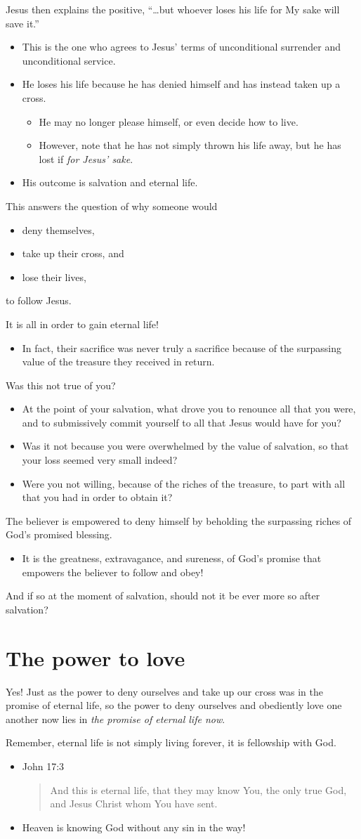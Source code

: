 \documentclass[12pt]{article}
\newcommand{\BI}{\begin{itemize}}
\newcommand{\EI}{\end{itemize}}
\newcommand{\I}{\item}
\newcommand{\Q}[1]{\begin{quote} #1 \end{quote}}
\begin{document}
\I  Jesus then explains the positive, 
        ``\dots but whoever loses his life for My sake will save it.''
\BI \I  This is the one who agrees to Jesus' terms of unconditional 
            surrender and unconditional service.
    \I  He loses his life because he has denied himself and 
            has instead taken up a cross.
    \BI \I  He may no longer please himself, or
                even decide how to live.
        \I  However, note that he has not simply thrown his life away,
                but he has lost if \emph{for Jesus' sake}. \EI  
    \I  His outcome is salvation and eternal life. \EI

\I  This answers the question of why someone would
\BI \I  deny themselves,
    \I  take up their cross, and
    \I  lose their lives, \EI
    to follow Jesus.

\I  It is all in order to gain eternal life!
\BI \I  In fact, their sacrifice was never truly a sacrifice
            because of the surpassing value of the treasure
            they received in return. \EI

\I  Was this not true of you?
\BI \I  At the point of your salvation,
            what drove you to renounce all that you were,
            and to submissively commit yourself to all that Jesus
            would have for you?
    \I  Was it not because you were overwhelmed by the value of
            salvation, so that your loss seemed very small indeed?
    \I  Were you not willing, because of the riches of the treasure,
            to part with all that you had in order to obtain it? \EI

\I  The believer is empowered to deny himself by
        beholding the surpassing riches of God's promised blessing.
\BI \I  It is the greatness, extravagance, and sureness,
            of God's promise that empowers the believer to
            follow and obey! \EI

\I  And if so at the moment of salvation,
        should not it be ever more so after salvation?

\section{The power to love}
\I  Yes! Just as the power to deny ourselves and take up our cross was in
        the promise of eternal life,
        so the power to deny ourselves and obediently love one another now
        lies in \emph{the promise of eternal life now}.

\I  Remember, eternal life is not simply living forever, it is fellowship with God.
\BI \I John 17:3
        \Q{ And this is eternal life, that they may know You, 
            the only true God, and Jesus Christ whom You have sent.} 
    \I  Heaven is knowing God without any sin in the way! \EI
        
\end{document}
